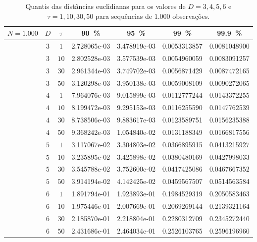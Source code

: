 \begin{table}[hbt]
	\centering
	\caption{Quantis das distâncias euclidianas para os valores de $D= 3, 4, 5, 6$ e $\tau=1, 10, 30, 50$ para sequências de $1.000$ observações.}\label{tab:dEuclid_1000}
	\begin{tabular}{ccccccc}
	\toprule
$N=1.000$	&  $D$  &$\tau$  &\SI{90}{\percent}&\SI{95}{\percent}&\SI{99}{\percent}&\SI{99.9}{\percent}\\
\midrule
			&  $3$ &  $ 1$ & 2.728065e-03  &  3.478919e-03  &  0.0053313857  &  0.0081048900 \\ 
			&  $3$ &  $10$ & 2.802528e-03  &  3.577539e-03  &  0.0054960059  &  0.0083091257 \\
			&  $3$ &  $30$ & 2.961344e-03  &  3.749702e-03  &  0.0056871429  &  0.0087472165 \\
			&  $3$ &  $50$ & 3.120298e-03  &  3.950138e-03  &  0.0059008109  &  0.0090272065 \\
\midrule
			&  $4$ &  $ 1$ & 7.964076e-03  &  9.015899e-03  &  0.0112777244  &  0.0143372255 \\ 
			&  $4$ &  $10$ & 8.199472e-03  &  9.295153e-03  &  0.0116255590  &  0.0147762539 \\
			&  $4$ &  $30$ & 8.738506e-03  &  9.883617e-03  &  0.0123589751  &  0.0156235388 \\
			&  $4$ &  $50$ & 9.368242e-03  &  1.054840e-02  &  0.0131188349  &  0.0166817556 \\
\midrule
			&  $5$ &  $ 1$ & 3.117067e-02  &  3.304803e-02  &  0.0366895915  &  0.0413215927 \\ 
			&  $5$ &  $10$ & 3.235895e-02  &  3.425898e-02  &  0.0380480169  &  0.0427998033 \\
			&  $5$ &  $30$ & 3.545788e-02  &  3.752600e-02  &  0.0417425086  &  0.0467667352 \\
			&  $5$ &  $50$ & 3.914194e-02  &  4.142425e-02  &  0.0459567507  &  0.0514563584 \\
\midrule
			&  $6$ &  $ 1$ & 1.891794e-01  &  1.923893e-01  &  0.1984529319  &  0.2050583463 \\
			&  $6$ &  $10$ & 1.975446e-01  &  2.007669e-01  &  0.2069269144  &  0.2139321164 \\
			&  $6$ &  $30$ & 2.185870e-01  &  2.218804e-01  &  0.2280312709  &  0.2345272440 \\
			&  $6$ &  $50$ & 2.431686e-01  &  2.464034e-01  &  0.2526103765  &  0.2596196960 \\
	\bottomrule
\end{tabular}
\end{table}

